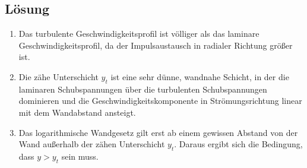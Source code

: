 \documentclass{exercise}
\begin{document}
    \subsection*{Lösung}
    \begin{enumerate}
        \item Das turbulente Geschwindigkeitsprofil ist völliger als das laminare Geschwindigkeitsprofil, da der Impulsaustausch in radialer Richtung größer ist.
        \item Die zähe Unterschicht \(y_t\) ist eine sehr dünne, wandnahe Schicht, in der die laminaren Schubspannungen über die turbulenten Schubspannungen dominieren und die Geschwindigkeitskomponente in Strömungsrichtung linear mit dem Wandabstand ansteigt.
        \item Das logarithmische Wandgesetz gilt erst ab einem gewissen Abstand von der Wand außerhalb der zähen Unterschicht \(y_t\).
        Daraus ergibt sich die Bedingung, dass \(y > y_t\) sein muss.
    \end{enumerate}
\end{document}
